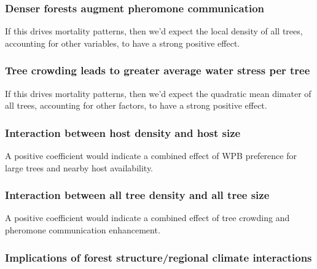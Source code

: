 \documentclass[]{article}
\begin{document}
\subsubsection{Denser forests augment pheromone
communication}\label{denser-forests-augment-pheromone-communication}

If this drives mortality patterns, then we'd expect the local density of
all trees, accounting for other variables, to have a strong positive
effect.

\subsubsection{Tree crowding leads to greater average water stress per
tree}\label{tree-crowding-leads-to-greater-average-water-stress-per-tree}

If this drives mortality patterns, then we'd expect the quadratic mean
dimater of all trees, accounting for other factors, to have a strong
positive effect.

\subsubsection{Interaction between host density and host
size}\label{interaction-between-host-density-and-host-size}

A positive coefficient would indicate a combined effect of WPB
preference for large trees and nearby host availability.

\subsubsection{Interaction between all tree density and all tree
size}\label{interaction-between-all-tree-density-and-all-tree-size}

A positive coefficient would indicate a combined effect of tree crowding
and pheromone communication enhancement.

\subsubsection{Implications of forest structure/regional climate
interactions}\label{implications-of-forest-structureregional-climate-interactions}
\end{document}
